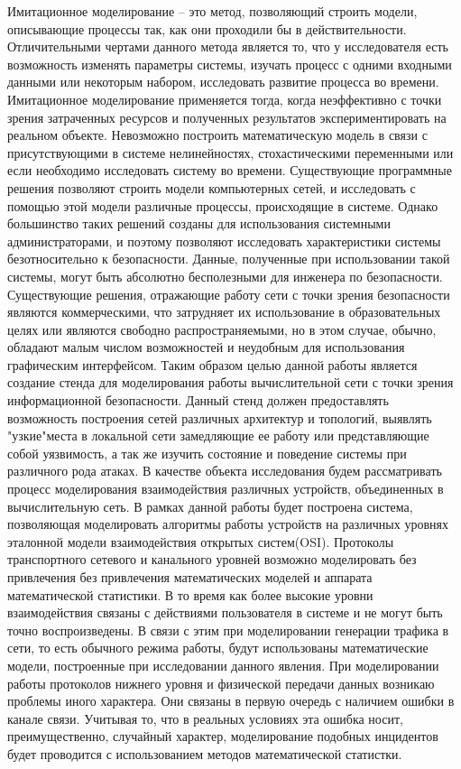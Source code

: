     Имитационное моделирование – это метод, позволяющий строить модели, описывающие процессы так, как они проходили бы в действительности. Отличительными чертами данного метода является то, что у исследователя есть возможность изменять параметры системы, изучать процесс с одними входными данными или некоторым набором, исследовать развитие процесса во времени. Имитационное моделирование применяется тогда, когда неэффективно с точки зрения затраченных ресурсов и полученных результатов экспериментировать на реальном объекте. Невозможно построить математическую модель в связи с присутствующими в системе нелинейностях, стохастическими переменными или если необходимо исследовать систему во времени. Существующие программные решения позволяют строить модели компьютерных сетей, и исследовать с помощью этой модели различные процессы, происходящие в системе. Однако большинство таких решений созданы для использования системными администраторами, и поэтому позволяют исследовать характеристики системы безотносительно к безопасности. Данные, полученные при использовании такой системы, могут быть абсолютно бесполезными для инженера по безопасности. Существующие решения, отражающие работу сети с точки зрения безопасности являются коммерческими, что затрудняет их использование в образовательных целях или являются свободно распространяемыми, но в этом случае, обычно, обладают малым числом возможностей и неудобным для использования графическим интерфейсом. Таким образом целью данной работы является создание стенда для моделирования работы вычислительной сети с точки зрения информационной безопасности. Данный стенд должен предоставлять возможность построения сетей различных архитектур и топологий, выявлять "узкие"места в локальной сети замедляющие ее работу или представляющие собой уязвимость, а так же изучить состояние и поведение системы при различного рода атаках. В качестве объекта исследования будем рассматривать процесс моделирования взаимодействия различных устройств, объединенных в вычислительную сеть. В рамках данной работы будет построена система, позволяющая моделировать алгоритмы работы устройств на различных уровнях эталонной модели взаимодействия открытых систем(OSI). Протоколы транспортного сетевого и канального уровней возможно моделировать без привлечения без привлечения математических моделей и аппарата математической статистики. В то время как более высокие уровни взаимодействия связаны с действиями пользователя в системе и не могут быть точно воспроизведены. В связи с этим при моделировании генерации трафика в сети, то есть обычного режима работы, будут использованы математические модели, построенные при исследовании данного явления. При моделировании работы протоколов нижнего уровня и физической передачи данных возникаю проблемы иного характера. Они связаны в первую очередь с наличием ошибки в канале связи. Учитывая то, что в реальных условиях эта ошибка носит, преимущественно, случайный характер, моделирование подобных инцидентов будет проводится с использованием методов математической статистки.
    
